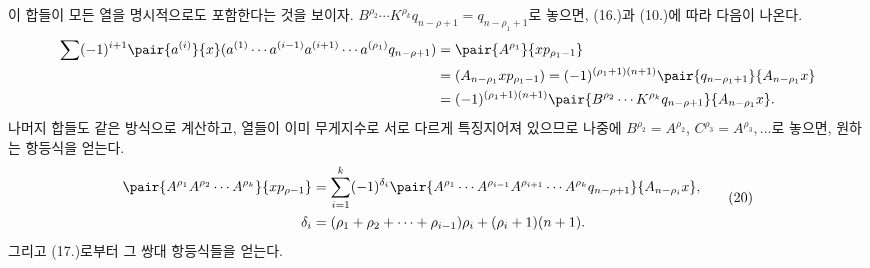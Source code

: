 
이 합들이 모든 열을 명시적으로도 포함한다는 것을 보이자. $B^{\rho_2}\cdots K^{\rho_k}q_{n-\rho+1}=q_{n-\rho_1+1}$로 놓으면, (16.)과 (10.)에 따라 다음이 나온다.
\begin{align*}
\sum(-1)^{i+1}\pair{a^{(i)}}{x}(a^{(1)}\cdots a^{(i-1)}a^{(i+1)}\cdots a^{(\rho_1)}q_{n-\rho+1})
&=\pair{A^{\rho_1}}{xp_{\rho_1-1}}\\
&=(A_{n-\rho_1}xp_{\rho_1-1})=(-1)^{(\rho_1+1)(n+1)}\pair{q_{n-\rho_1+1}}{A_{n-\rho_1}x}\\
&=(-1)^{(\rho_1+1)(n+1)}\pair{B^{\rho_2}\cdots K^{\rho_k}q_{n-\rho+1}}{A_{n-\rho_1}x}.
\end{align*}
나머지 합들도 같은 방식으로 계산하고, 열들이 이미 무게지수로 서로 다르게 특징지어져 있으므로 나중에 $B^{\rho_2}=A^{\rho_2}$, $C^{\rho_3}=A^{\rho_3},\ldots$로 놓으면, 원하는 항등식을 얻는다.
\begin{equation}
\begin{aligned}
\pair{A^{\rho_1}A^{\rho_2}\cdots A^{\rho_k}}{xp_{\rho-1}}
&=\sum_{i=1}^{k}(-1)^{\delta_i}\pair{A^{\rho_1}\cdots A^{\rho_{i-1}}A^{\rho_{i+1}}\cdots A^{\rho_k}q_{n-\rho+1}}{A_{n-\rho_i}x},\\
\delta_i&=(\rho_1+\rho_2+\cdots+\rho_{i-1})\rho_i+(\rho_i+1)(n+1).
\end{aligned}
\tag{20}
\end{equation}
그리고 (17.)로부터 그 쌍대 항등식들을 얻는다.
